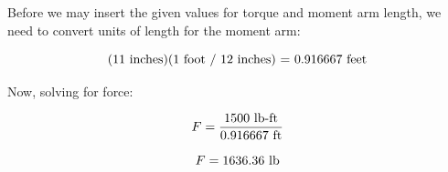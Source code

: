 Before we may insert the given values for torque and moment arm length, we need to convert units of length for the moment arm:

$$\hbox{(11 inches)(1 foot / 12 inches) = 0.916667 feet}$$

Now, solving for force:

$$F = {1500 \hbox{ lb-ft} \over 0.916667 \hbox{ ft}}$$

$$F = 1636.36 \hbox{ lb}$$
 










